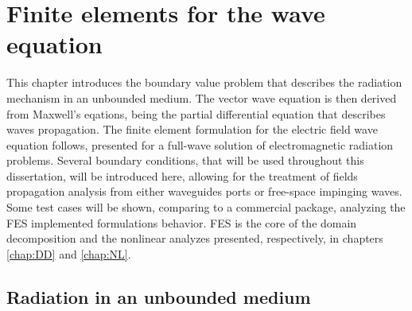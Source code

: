 \graphicspath{{img/ch1/}}
\chapter{Finite elements for the wave equation} \label{chap:FE}

\par This chapter introduces the boundary value problem that describes the radiation mechanism in an unbounded medium. The vector wave equation is then derived from Maxwell's eqations, being the partial differential equation that describes waves propagation. The finite element formulation for the electric field wave equation follows, presented for a full-wave solution of electromagnetic radiation problems. Several boundary conditions, that will be used throughout this dissertation, will be introduced here, allowing for the treatment of fields propagation analysis from either waveguides ports or free-space impinging waves. Some test cases will be shown, comparing to a commercial package, analyzing the FES implemented formulations behavior. FES is the core of the domain decomposition and the nonlinear analyzes presented, respectively, in chapters \ref{chap:DD} and \ref{chap:NL}.


\section{Radiation in an unbounded medium}

